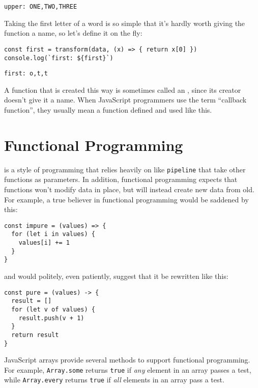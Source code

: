 \begin{verbatim}
upper: ONE,TWO,THREE
\end{verbatim}

Taking the first letter of a word is so simple that it's hardly worth giving the function a name,
so let's define it on the fly:

\begin{verbatim}
const first = transform(data, (x) => { return x[0] })
console.log(`first: ${first}`)
\end{verbatim}

\begin{verbatim}
first: o,t,t
\end{verbatim}

A function that is created this way is sometimes called an ,
since its creator doesn't give it a name.
When JavaScript programmers use the term ``callback function'',
they usually mean a function defined and used like this.

\section{Functional Programming}\label{s:callbacks-functional}

 is a style of programming
that relies heavily on  like \texttt{pipeline}
that take other functions as parameters.
In addition,
functional programming expects that functions won't modify data in place,
but will instead create new data from old.
For example,
a true believer in functional programming would be saddened by this:

\begin{verbatim}
const impure = (values) => {
  for (let i in values) {
    values[i] += 1
  }
}
\end{verbatim}

\noindent
and would politely, even patiently, suggest that it be rewritten like this:

\begin{verbatim}
const pure = (values) -> {
  result = []
  for (let v of values) {
    result.push(v + 1)
  }
  return result
}
\end{verbatim}

JavaScript arrays provide several methods to support functional programming.
For example,
\texttt{Array.some} returns \texttt{true} if \emph{any} element in an array passes a test,
while \texttt{Array.every} returns \texttt{true} if \emph{all} elements in an array pass a test.

